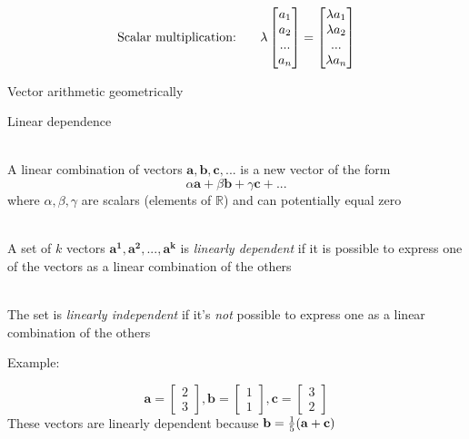 \documentclass[10pt]{seminar}
\begin{document}
\begin{slide}
$$
\hbox{Scalar multiplication:  \hspace{.2in}}
\lambda \begin{bmatrix}
a_1\\a_2\\ ... \\a_n
\end{bmatrix}
=
\begin{bmatrix}
\lambda a_1\\\lambda a_2\\ ... \\ \lambda a_n
\end{bmatrix}
$$


\newslide

Vector arithmetic geometrically

\begin{center}
\end{center}

\newslide

Linear dependence

\ \\A linear combination of vectors $\mathbf{a, b, c, ...} $ is a new vector of the form
$$\alpha \mathbf{a}+ \beta \mathbf{b}+\gamma \mathbf{c}+...$$ where $\alpha, \beta, \gamma$ are scalars (elements of $\mathbb{R}$) and can potentially equal zero

\ \\A set of $k$ vectors $\mathbf{a^1, a^2, ..., a^k}$ is \textit{linearly dependent} if it is possible to express one of the vectors as a linear combination of the others

\ \\The set is \textit{linearly independent} if it's \textit{not} possible to express one as a linear combination of the others


\newslide

Example: 

$$
\mathbf{a}=
\begin{bmatrix}
2 \\ 3
\end{bmatrix},
\mathbf{b}=
\begin{bmatrix}
1 \\ 1
\end{bmatrix},
\mathbf{c}=
\begin{bmatrix}
3 \\ 2
\end{bmatrix}
$$
These vectors are linearly dependent because $\mathbf{b}={1\over 5}(\mathbf{a}+\mathbf{c})$


\end{slide}
\end{document}
